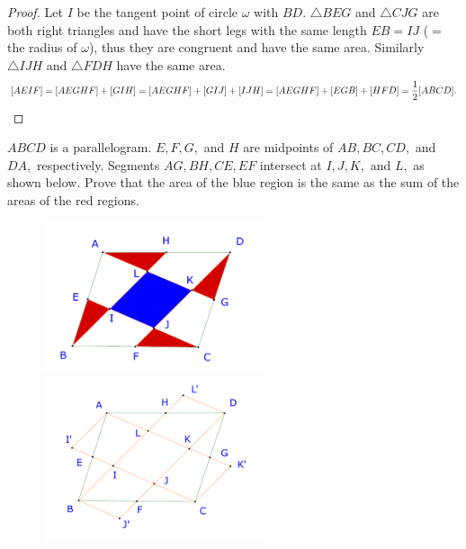 \documentclass{article}
\begin{document}
\begin{proof}
    Let $I$ be the tangent point of circle $\omega$ with $BD.$ $\triangle BEG$ and $\triangle CJG$ are both right triangles
    and have the short legs with the same length $EB=IJ$ ($=$ the radius of $\omega$), thus they are congruent and have the same area.
    Similarly $\triangle IJH$ and $\triangle FDH$ have the same area.
    \[ 
        [AEIF] = [AEGHF] + [GIH] = [AEGHF] + [GIJ] + [IJH] = [AEGHF] + [EGB] +  [HFD] = \frac{1}{2} [ABCD].
    \]
\end{proof}

\newpage

\begin{example*}[Example 7]
    \label{example:23-24-s3-i-p7}
    $ABCD$ is a parallelogram. $E, F, G,$ and $H$ are midpoints of $AB, BC, CD,$ and $DA,$ respectively.
    Segments $AG, BH, CE, EF$ intersect at $I, J, K,$ and $L,$ as shown below. 
    Prove that the area of the blue region is the same as the sum of the areas of the red regions.
\end{example*}

\begin{figure}[h]
    \centering
    \begin{minipage}[t]{6.5cm}
        \begin{center}
            \includegraphics[width=6.5cm]{./svg/pdf/23-24-s3-i-p7.pdf}
        \end{center}
    \end{minipage}
    \qquad
    \begin{minipage}[t]{6.5cm}
        \centering
        \begin{center}
            \includegraphics[width=6.5cm]{./svg/pdf/23-24-s3-i-p7-s.pdf}
        \end{center}
    \end{minipage}
\end{figure}
\end{document}
